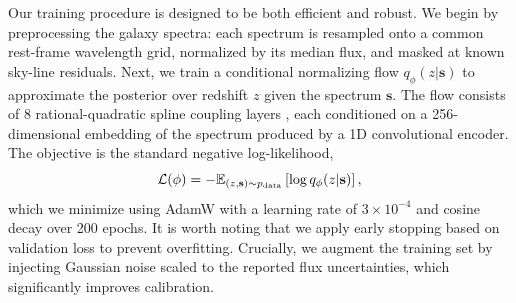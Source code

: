 Our training procedure is designed to be both efficient and robust. We begin by preprocessing the galaxy spectra: each spectrum is resampled onto a common rest-frame wavelength grid, normalized by its median flux, and masked at known sky-line residuals. Next, we train a conditional normalizing flow $q_\phi(z | \mathbf{s})$ to approximate the posterior over redshift $z$ given the spectrum $\mathbf{s}$. The flow consists of 8 rational-quadratic spline coupling layers \citep{durkan2019}, each conditioned on a 256-dimensional embedding of the spectrum produced by a 1D convolutional encoder. The objective is the standard negative log-likelihood,
\begin{equation}
\mathcal{L}(\phi) = -\mathbb{E}_{(z, \mathbf{s}) \sim p_{\rm data}} \left[ \log q_\phi(z | \mathbf{s}) \right],
\end{equation}
which we minimize using AdamW with a learning rate of $3\times10^{-4}$ and cosine decay over 200 epochs. It is worth noting that we apply early stopping based on validation loss to prevent overfitting. Crucially, we augment the training set by injecting Gaussian noise scaled to the reported flux uncertainties, which significantly improves calibration.
